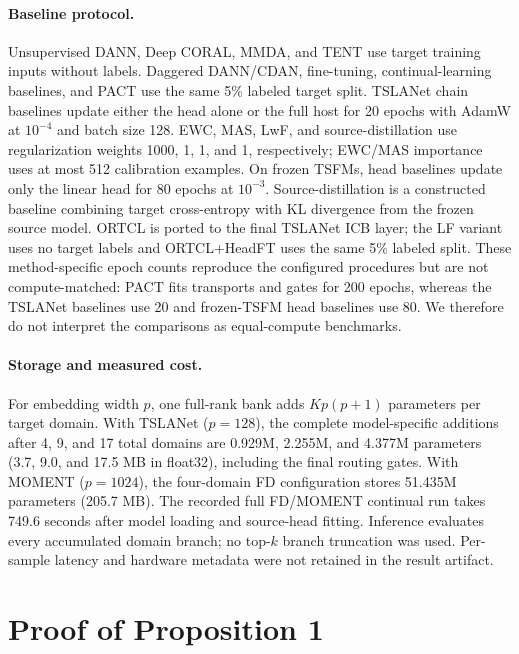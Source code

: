 \documentclass[letterpaper]{article}
\begin{document}
\paragraph{Baseline protocol.}
Unsupervised DANN, Deep CORAL, MMDA, and TENT use target training inputs without
labels. Daggered DANN/CDAN, fine-tuning, continual-learning baselines, and PACT
use the same 5\% labeled target split. TSLANet chain baselines update either the
head alone or the full host for 20 epochs with AdamW at $10^{-4}$ and batch size
128. EWC, MAS, LwF, and source-distillation use regularization weights 1000, 1,
1, and 1, respectively; EWC/MAS importance uses at most 512 calibration
examples. On frozen TSFMs, head baselines update only the linear head for 80
epochs at $10^{-3}$. Source-distillation is a constructed baseline combining
target cross-entropy with KL divergence from the frozen source model. ORTCL is
ported to the final TSLANet ICB layer; the LF variant uses no target labels and
ORTCL+HeadFT uses the same 5\% labeled split.
These method-specific epoch counts reproduce the configured procedures but are
not compute-matched: PACT fits transports and gates for 200 epochs, whereas the
TSLANet baselines use 20 and frozen-TSFM head baselines use 80. We therefore do
not interpret the comparisons as equal-compute benchmarks.

\paragraph{Storage and measured cost.}
For embedding width $p$, one full-rank bank adds $Kp(p+1)$ parameters per target
domain. With TSLANet ($p=128$), the complete model-specific additions after 4,
9, and 17 total domains are 0.929M, 2.255M, and 4.377M parameters (3.7, 9.0,
and 17.5 MB in float32), including the final routing gates. With MOMENT
($p=1024$), the four-domain FD configuration stores 51.435M parameters
(205.7 MB). The recorded full FD/MOMENT continual run takes 749.6 seconds after
model loading and source-head fitting. Inference evaluates every accumulated
domain branch; no top-$k$ branch truncation was used. Per-sample latency and
hardware metadata were not retained in the result artifact.

\section{Proof of Proposition 1}
\end{document}
